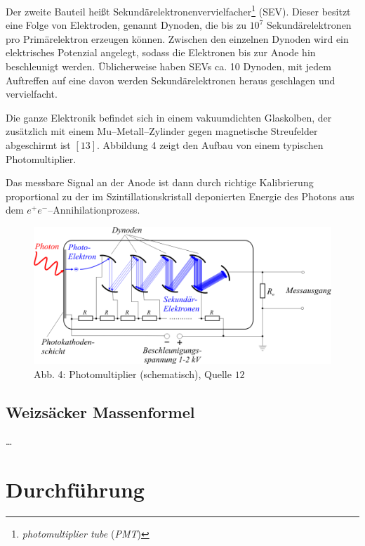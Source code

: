 \documentclass[12pt,a4paper]{scrartcl}
\numberwithin{equation}{section} %
\renewcommand{\[}{} %
\renewcommand{\]}{\noindent} %
\begin{document}
Der zweite Bauteil heißt Sekundärelektronenvervielfacher\footnote{\emph{photomultiplier
  tube} (\emph{PMT})} (SEV). Dieser besitzt eine Folge von Elektroden,
genannt Dynoden, die bis zu \(10^7\) Sekundärelektronen pro
Primärelektron erzeugen können. Zwischen den einzelnen Dynoden wird ein
elektrisches Potenzial angelegt, sodass die Elektronen bis zur Anode hin
beschleunigt werden. Üblicherweise haben SEVs ca. 10 Dynoden, mit jedem
Auftreffen auf eine davon werden Sekundärelektronen heraus geschlagen
und vervielfacht.

Die ganze Elektronik befindet sich in einem vakuumdichten Glaskolben,
der zusätzlich mit einem Mu--Metall--Zylinder gegen magnetische
Streufelder abgeschirmt ist \([13]\). Abbildung 4 zeigt den Aufbau von
einem typischen Photomultiplier.

Das messbare Signal an der Anode ist dann durch richtige Kalibrierung
proportional zu der im Szintillationskristall deponierten Energie des
Photons aus dem \(e^+ e^-\)--Annihilationprozess.

\begin{figure}
\centering
\includegraphics{../media/B3.4/Photomultiplier_schema_de.png}
\caption{Abb. 4: Photomultiplier (schematisch), Quelle \(12\)}
\end{figure}

\hypertarget{weizsuxe4cker-massenformel}{%
\subsection{Weizsäcker Massenformel}\label{weizsuxe4cker-massenformel}}

\ldots{}

\clearpage
\hypertarget{durchfuxfchrung}{%
\section{Durchführung}\label{durchfuxfchrung}}
\end{document}
